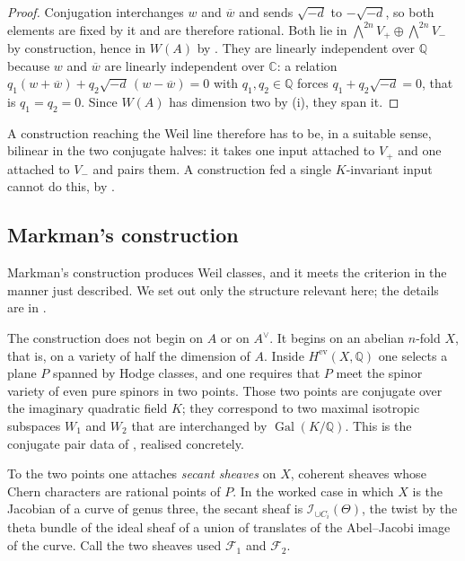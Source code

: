 \documentclass[11pt,reqno]{amsart}
\theoremstyle{plain}
\theoremstyle{definition}
\theoremstyle{remark}
\newcommand{\QQ}{\mathbb{Q}}
\newcommand{\CC}{\mathbb{C}}
\newcommand{\Av}{A^{\vee}}
\newcommand{\cF}{\mathcal{F}}
\newcommand{\HW}{W}                      %
\DeclareMathOperator{\Gal}{Gal}
\newcommand{\bbar}[1]{\overline{#1}}
\begin{document}
\begin{proof}
Conjugation interchanges $w$ and $\bbar{w}$ and sends $\sqrt{-d}$ to
$-\sqrt{-d}$, so both elements are fixed by it and are therefore rational.
Both lie in $\bigwedge^{2n}V_{+}\oplus\bigwedge^{2n}V_{-}$ by construction,
hence in $\HW(A)$ by . They are linearly independent over
$\QQ$ because $w$ and $\bbar{w}$ are linearly independent over $\CC$: a
relation $q_{1}(w+\bbar{w})+q_{2}\sqrt{-d}\,(w-\bbar{w})=0$ with
$q_{1},q_{2}\in\QQ$ forces $q_{1}+q_{2}\sqrt{-d}=0$, that is $q_{1}=q_{2}=0$.
Since $\HW(A)$ has dimension two by (i), they span it.
\end{proof}

A construction reaching the Weil line therefore has to be, in a suitable
sense, bilinear in the two conjugate halves: it takes one input attached to
$V_{+}$ and one attached to $V_{-}$ and pairs them. A construction fed a
single $K$-invariant input cannot do this, by .

\subsection{Markman's construction}

Markman's construction \cite{Mar25a,Mar25b} produces Weil classes, and it
meets the criterion in the manner just described. We set out only the
structure relevant here; the details are in \cite{Mar25b}.

The construction does not begin on $A$ or on $\Av$. It begins on an abelian
$n$-fold $X$, that is, on a variety of half the dimension of $A$. Inside
$H^{\mathrm{ev}}(X,\QQ)$ one selects a plane $P$ spanned by Hodge classes, and
one requires that $P$ meet the spinor variety of even pure spinors in two
points. Those two points are conjugate over the imaginary quadratic field $K$;
they correspond to two maximal isotropic subspaces $W_{1}$ and $W_{2}$ that are
interchanged by $\Gal(K/\QQ)$. This is the conjugate pair data of
, realised concretely.

To the two points one attaches \emph{secant sheaves} on $X$, coherent
sheaves whose Chern characters are rational points of $P$. In the worked case
in which $X$ is the Jacobian of a curve of genus three, the secant sheaf is
$\mathcal{I}_{\cup C_{i}}(\Theta)$, the twist by the theta bundle of the ideal
sheaf of a union of translates of the Abel--Jacobi image of the curve. Call the
two sheaves used $\cF_{1}$ and $\cF_{2}$.
\end{document}
